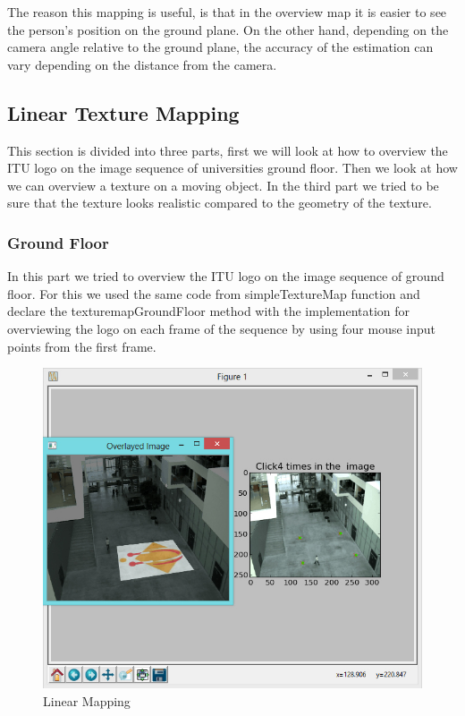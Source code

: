 The reason this mapping is useful, is that in the overview map it is easier to see the person's position on the ground plane. On the other hand, depending on the camera angle relative to the ground plane, the accuracy of the estimation can vary depending on the distance from the camera.

\subsection{Linear Texture Mapping}

This section is divided into three parts, first we will look at how to overview the ITU logo on the image sequence of universities ground floor. Then we look at how we can overview a texture on a moving object. In the third part we tried to be sure that the texture looks realistic compared to the geometry of the texture.

\subsubsection{Ground Floor}

In this part we tried to overview the ITU logo on the image sequence of ground floor. For this we used the same code from simpleTextureMap function and declare the texturemapGroundFloor method with the implementation for overviewing the logo on each frame of the sequence by using four mouse input points from the first frame.

\begin{figure}[h!]
	\centering
	\includegraphics[width=\textwidth]{final/images/linearmapping.jpg}
	\caption{Linear Mapping}
	\label{fig:linearmapping}
\end{figure}

